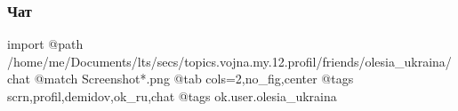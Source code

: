  
 
 
 
 

\subsubsection{Чат}

\ifcmt
 import
 @path /home/me/Documents/lts/secs/topics.vojna.my.12.profil/friends/olesia_ukraina/chat
 @match Screenshot*.png
 @tab cols=2,no_fig,center
 @tags scrn,profil,demidov,ok_ru,chat
 @tags ok.user.olesia_ukraina
\fi

